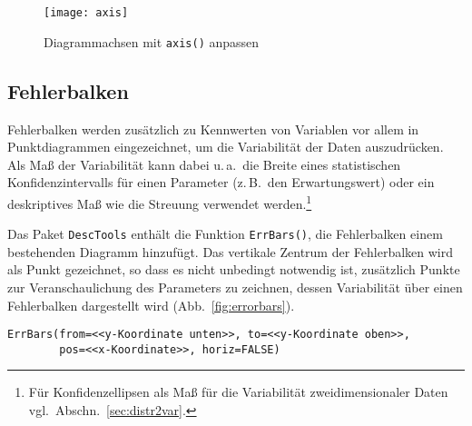 \begin{figure}[ht]
\centering
\texttt{[image: axis]}
\vspace*{-1em}
\caption{Diagrammachsen mit \lstinline!axis()! anpassen}
\label{fig:axis}
\end{figure}

\subsection{Fehlerbalken}

Fehlerbalken werden zusätzlich zu Kennwerten von Variablen vor allem in Punktdiagrammen eingezeichnet, um die Variabilität der Daten auszudrücken. Als Maß der Variabilität kann dabei u.\,a.\ die Breite eines statistischen Konfidenzintervalls für einen Parameter (z.\,B.\ den Erwartungswert) oder ein deskriptives Maß wie die Streuung verwendet werden.\footnote{Für Konfidenzellipsen als Maß für die Variabilität zweidimensionaler Daten vgl.\ Abschn.\ \ref{sec:distr2var}.}

Das Paket \lstinline!DescTools! enthält die Funktion \lstinline!ErrBars()!, die Fehlerbalken einem bestehenden Diagramm hinzufügt. Das vertikale Zentrum der Fehlerbalken wird als Punkt gezeichnet, so dass es nicht unbedingt notwendig ist, zusätzlich Punkte zur Veranschaulichung des Parameters zu zeichnen, dessen Variabilität über einen Fehlerbalken dargestellt wird (Abb.\ \ref{fig:errorbars}).
\begin{lstlisting}
ErrBars(from=<<y-Koordinate unten>>, to=<<y-Koordinate oben>>,
        pos=<<x-Koordinate>>, horiz=FALSE)
\end{lstlisting}


